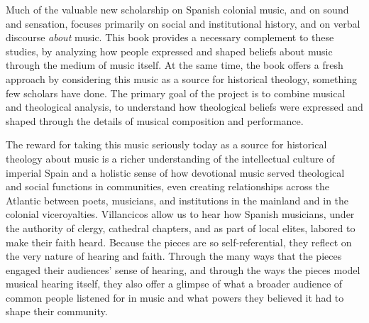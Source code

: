 Much of the valuable new scholarship on Spanish colonial music, and on sound
and sensation, focuses primarily on social and institutional history, and on
verbal discourse \emph{about} music.%
    \Autocites{Baker:Harmony}{BakerKnighton:MusicUrbanSociety}
    {Irving:Colonial}{RamosKittrell:PlayingCathedral}
    {DellAntonio:Listening}
This book provides a necessary complement to these studies, by analyzing how
people expressed and shaped beliefs about music through the medium of music
itself.
At the same time, the book offers a fresh approach by considering this music as
a source for historical theology, something few scholars have done.
The primary goal of the project is to combine musical and theological analysis,
to understand how theological beliefs were expressed and shaped through the
details of musical composition and performance.

The reward for taking this music seriously today as a source for historical
theology about music is a richer understanding of the intellectual culture of
imperial Spain and a holistic sense of how devotional music served theological
and social functions in communities, even creating relationships across the
Atlantic between poets, musicians, and institutions in the mainland and in
the colonial viceroyalties.
Villancicos allow us to hear how Spanish musicians, under the authority of
clergy, cathedral chapters, and as part of local elites, labored to make their
faith heard.
Because the pieces are so self-referential, they reflect on the very nature of
hearing and faith.
Through the many ways that the pieces engaged their audiences' sense of hearing,
and through the ways the pieces model musical hearing itself, they also offer a
glimpse of what a broader audience of common people listened for in music and
what powers they believed it had to shape their community.

\endinput

\section{Hearing and Communication}

Villancicos were the most widespread form of religious music with words in
vernacular languages in the Catholic world after the Council of Trent, and they
provide evidence for a sustained endeavor by church leaders to establish
conventions of communication with ordinary people.
The creators of villancicos drew on common experiences of everyday life and
linked them to the sacred in inventive ways that met the spiritual needs of
specific communities.
Each piece provides a new answer to Christ's question, \quoted{With what can we
compare the kingdom of God, or what parable will we use for it?}
(\scripture{Mk}{4:21}).
Villancicos thus represent a key component of the Spanish church's effort
to use music to make faith appeal to hearing.
They are evidence of the church working to accommodate hearing and train it at
the same time.

